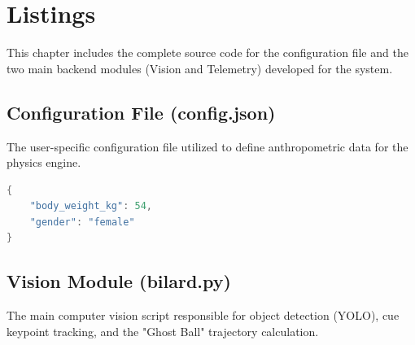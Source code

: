 \chapter{Listings}
\renewcommand{\thesection}{\arabic{section}.}

This chapter includes the complete source code for the configuration file and the two main backend modules (Vision and Telemetry) developed for the system.

\section{Configuration File (config.json)}
The user-specific configuration file utilized to define anthropometric data for the physics engine.

\begin{lstlisting}[language=Java, caption={Content of config.json}, label={lst:config_json}]
{
    "body_weight_kg": 54,
    "gender": "female"
}
\end{lstlisting}

\section{Vision Module (bilard.py)}
The main computer vision script responsible for object detection (YOLO), cue keypoint tracking, and the "Ghost Ball" trajectory calculation.

